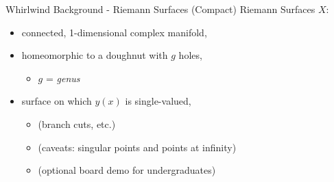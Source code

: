 \documentclass{beamer}
\begin{document}
\begin{frame}{Whirlwind Background - Riemann Surfaces}{}
  (Compact) Riemann Surfaces $X$:

  \begin{itemize}[<+->]
    \item connected, 1-dimensional complex manifold,
    \item homeomorphic to a doughnut with $g$ holes,
      \begin{itemize}
        \item $g$ = {\it genus}
      \end{itemize}
    \item surface on which $y(x)$ is single-valued,
      \begin{itemize}
        \item (branch cuts, etc.)
        \item (caveats: singular points and points at infinity)
        \item (optional board demo for undergraduates)
      \end{itemize}
  \end{itemize}
\end{frame}
\end{document}
